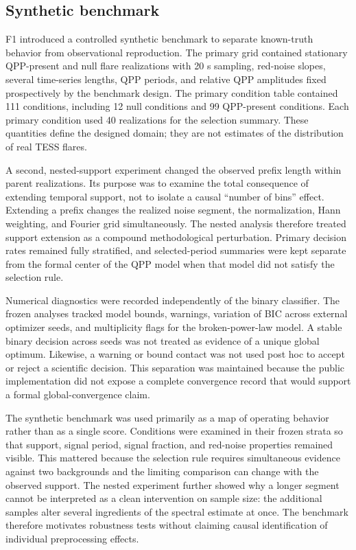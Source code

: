 \documentclass[11pt,a4paper]{article}
\begin{document}
\subsection{Synthetic benchmark}
F1 introduced a controlled synthetic benchmark to separate known-truth behavior from observational reproduction. The primary grid contained stationary QPP-present and null flare realizations with 20 s sampling, red-noise slopes, several time-series lengths, QPP periods, and relative QPP amplitudes fixed prospectively by the benchmark design. The primary condition table contained 111 conditions, including 12 null conditions and 99 QPP-present conditions. Each primary condition used 40 realizations for the selection summary. These quantities define the designed domain; they are not estimates of the distribution of real TESS flares.

A second, nested-support experiment changed the observed prefix length within parent realizations. Its purpose was to examine the total consequence of extending temporal support, not to isolate a causal ``number of bins'' effect. Extending a prefix changes the realized noise segment, the normalization, Hann weighting, and Fourier grid simultaneously. The nested analysis therefore treated support extension as a compound methodological perturbation. Primary decision rates remained fully stratified, and selected-period summaries were kept separate from the formal center of the QPP model when that model did not satisfy the selection rule.

Numerical diagnostics were recorded independently of the binary classifier. The frozen analyses tracked model bounds, warnings, variation of BIC across external optimizer seeds, and multiplicity flags for the broken-power-law model. A stable binary decision across seeds was not treated as evidence of a unique global optimum. Likewise, a warning or bound contact was not used post hoc to accept or reject a scientific decision. This separation was maintained because the public implementation did not expose a complete convergence record that would support a formal global-convergence claim.

The synthetic benchmark was used primarily as a map of operating behavior rather than as a single score. Conditions were examined in their frozen strata so that support, signal period, signal fraction, and red-noise properties remained visible. This mattered because the selection rule requires simultaneous evidence against two backgrounds and the limiting comparison can change with the observed support. The nested experiment further showed why a longer segment cannot be interpreted as a clean intervention on sample size: the additional samples alter several ingredients of the spectral estimate at once. The benchmark therefore motivates robustness tests without claiming causal identification of individual preprocessing effects.
\end{document}
